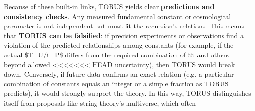 \documentclass[]{article}
\begin{document}
Because of these built-in links, TORUS yields clear \textbf{predictions
and consistency checks}. Any measured fundamental constant or
cosmological parameter is not independent but must fit the recursion's
relations. This means that \textbf{TORUS can be falsified}: if precision
experiments or observations find a violation of the predicted
relationships among constants (for example, if the actual \$T\_U/t\_P\$
differs from the required combination of \$\alpha\$ and others beyond allowed
<<<<<<< HEAD
uncertainty), then TORUS would break down\hspace{0pt}. Conversely, if
future data confirms an exact relation (e.g. a particular combination of
constants equals an integer or a simple fraction as TORUS predicts), it
would strongly support the theory. In this way, TORUS distinguishes
itself from proposals like string theory's multiverse, which often
\end{document}
